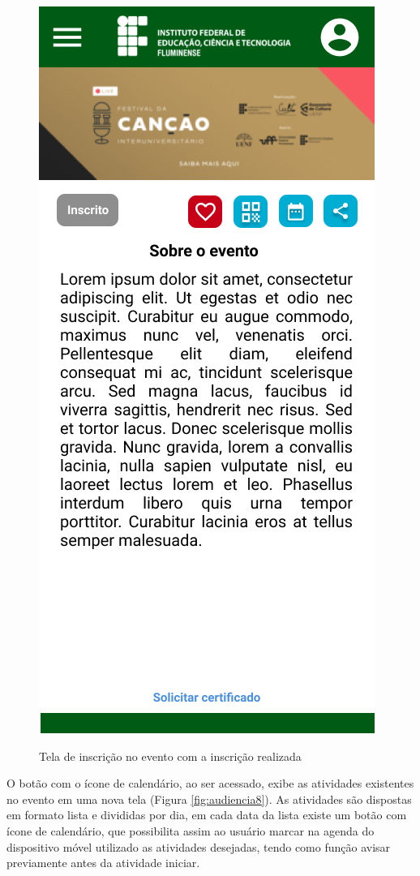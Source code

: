 \begin{figure}[H]
    \centering
    \caption{Tela de inscrição no evento com a inscrição realizada}
    \includegraphics[scale=0.44]{figuras/Audiencia/7-EventoInscrito.jpg}
    \label{fig:audiencia7}
\end{figure}
   
O botão com o ícone de calendário, ao ser acessado, exibe as atividades existentes no evento em uma nova tela (Figura \ref{fig:audiencia8}). As atividades são dispostas em formato lista e divididas por dia, em cada data da lista existe um botão com ícone de calendário, que possibilita assim ao usuário marcar na agenda do dispositivo móvel utilizado as atividades desejadas, tendo como função avisar previamente antes da atividade iniciar.

